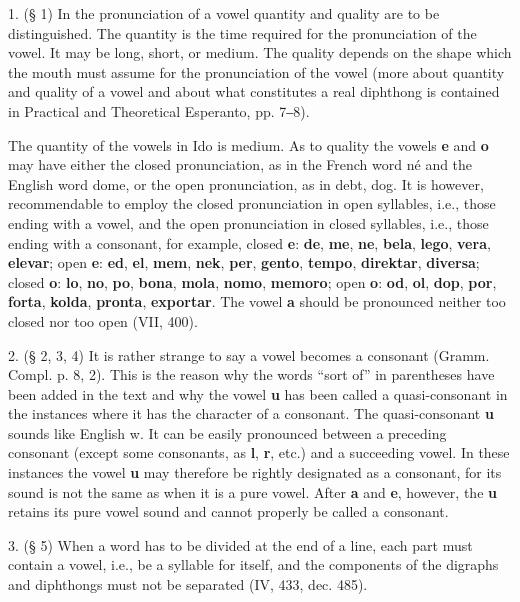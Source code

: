 1. (§ 1) In the pronunciation of a vowel quantity and quality are to be distinguished. The quantity is the time required for the pronunciation of the vowel. It may be long, short, or medium. The quality depends on the shape which the mouth must assume for the pronunciation of the vowel (more about quantity and quality of a vowel and about what constitutes a real diphthong is contained in Practical and Theoretical Esperanto, pp. 7‒8).

The quantity of the vowels in Ido is medium. As to quality the vowels \textbf{e} and \textbf{o} may have either the closed pronunciation, as in the French word né and the English word dome, or the open pronunciation, as in debt, dog. It is however, recommendable to employ the closed pronunciation in open syllables, i.e., those ending with a vowel, and the open pronunciation in closed syllables, i.e., those ending with a consonant, for example, closed \textbf{e}: \textbf{de}, \textbf{me}, \textbf{ne}, \textbf{bela}, \textbf{lego}, \textbf{vera}, \textbf{elevar}; open \textbf{e}: \textbf{ed}, \textbf{el}, \textbf{mem}, \textbf{nek}, \textbf{per}, \textbf{gento}, \textbf{tempo}, \textbf{direktar}, \textbf{diversa}; closed \textbf{o}: \textbf{lo}, \textbf{no}, \textbf{po}, \textbf{bona}, \textbf{mola}, \textbf{nomo}, \textbf{memoro}; open \textbf{o}: \textbf{od}, \textbf{ol}, \textbf{dop}, \textbf{por}, \textbf{forta}, \textbf{kolda}, \textbf{pronta}, \textbf{exportar}. The vowel \textbf{a} should be pronounced neither too closed nor too open (VII, 400).

2. (§ 2, 3, 4) It is rather strange to say a vowel becomes a consonant (Gramm. Compl. p. 8, 2). This is the reason why the words ``sort of'' in parentheses have been added in the text and why the vowel \textbf{u} has been called a quasi-consonant in the instances where it has the character of a consonant. The quasi-consonant \textbf{u} sounds like English w. It can be easily pronounced between a preceding consonant (except some consonants, as \textbf{l}, \textbf{r}, etc.) and a succeeding vowel. In these instances the vowel \textbf{u} may therefore be rightly designated as a consonant, for its sound is not the same as when it is a pure vowel. After \textbf{a} and \textbf{e}, however, the \textbf{u} retains its pure vowel sound and cannot properly be called a consonant.

3. (§ 5) When a word has to be divided at the end of a line, each part must contain a vowel, i.e., be a syllable for itself, and the components of the digraphs and diphthongs must not be separated (IV, 433, dec. 485).

